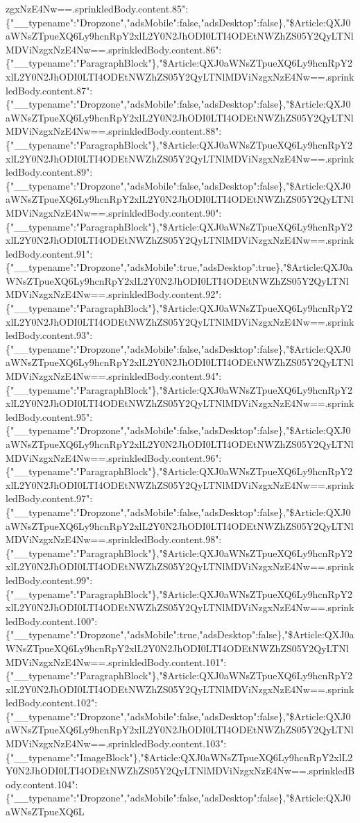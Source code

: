 zgxNzE4Nw==.sprinkledBody.content.85":\{"\_\_typename":"Dropzone","adsMobile":false,"adsDesktop":false\},"\$Article:QXJ0aWNsZTpueXQ6Ly9hcnRpY2xlL2Y0N2JhODI0LTI4ODEtNWZhZS05Y2QyLTNlMDViNzgxNzE4Nw==.sprinkledBody.content.86":\{"\_\_typename":"ParagraphBlock"\},"\$Article:QXJ0aWNsZTpueXQ6Ly9hcnRpY2xlL2Y0N2JhODI0LTI4ODEtNWZhZS05Y2QyLTNlMDViNzgxNzE4Nw==.sprinkledBody.content.87":\{"\_\_typename":"Dropzone","adsMobile":false,"adsDesktop":false\},"\$Article:QXJ0aWNsZTpueXQ6Ly9hcnRpY2xlL2Y0N2JhODI0LTI4ODEtNWZhZS05Y2QyLTNlMDViNzgxNzE4Nw==.sprinkledBody.content.88":\{"\_\_typename":"ParagraphBlock"\},"\$Article:QXJ0aWNsZTpueXQ6Ly9hcnRpY2xlL2Y0N2JhODI0LTI4ODEtNWZhZS05Y2QyLTNlMDViNzgxNzE4Nw==.sprinkledBody.content.89":\{"\_\_typename":"Dropzone","adsMobile":false,"adsDesktop":false\},"\$Article:QXJ0aWNsZTpueXQ6Ly9hcnRpY2xlL2Y0N2JhODI0LTI4ODEtNWZhZS05Y2QyLTNlMDViNzgxNzE4Nw==.sprinkledBody.content.90":\{"\_\_typename":"ParagraphBlock"\},"\$Article:QXJ0aWNsZTpueXQ6Ly9hcnRpY2xlL2Y0N2JhODI0LTI4ODEtNWZhZS05Y2QyLTNlMDViNzgxNzE4Nw==.sprinkledBody.content.91":\{"\_\_typename":"Dropzone","adsMobile":true,"adsDesktop":true\},"\$Article:QXJ0aWNsZTpueXQ6Ly9hcnRpY2xlL2Y0N2JhODI0LTI4ODEtNWZhZS05Y2QyLTNlMDViNzgxNzE4Nw==.sprinkledBody.content.92":\{"\_\_typename":"ParagraphBlock"\},"\$Article:QXJ0aWNsZTpueXQ6Ly9hcnRpY2xlL2Y0N2JhODI0LTI4ODEtNWZhZS05Y2QyLTNlMDViNzgxNzE4Nw==.sprinkledBody.content.93":\{"\_\_typename":"Dropzone","adsMobile":false,"adsDesktop":false\},"\$Article:QXJ0aWNsZTpueXQ6Ly9hcnRpY2xlL2Y0N2JhODI0LTI4ODEtNWZhZS05Y2QyLTNlMDViNzgxNzE4Nw==.sprinkledBody.content.94":\{"\_\_typename":"ParagraphBlock"\},"\$Article:QXJ0aWNsZTpueXQ6Ly9hcnRpY2xlL2Y0N2JhODI0LTI4ODEtNWZhZS05Y2QyLTNlMDViNzgxNzE4Nw==.sprinkledBody.content.95":\{"\_\_typename":"Dropzone","adsMobile":false,"adsDesktop":false\},"\$Article:QXJ0aWNsZTpueXQ6Ly9hcnRpY2xlL2Y0N2JhODI0LTI4ODEtNWZhZS05Y2QyLTNlMDViNzgxNzE4Nw==.sprinkledBody.content.96":\{"\_\_typename":"ParagraphBlock"\},"\$Article:QXJ0aWNsZTpueXQ6Ly9hcnRpY2xlL2Y0N2JhODI0LTI4ODEtNWZhZS05Y2QyLTNlMDViNzgxNzE4Nw==.sprinkledBody.content.97":\{"\_\_typename":"Dropzone","adsMobile":false,"adsDesktop":false\},"\$Article:QXJ0aWNsZTpueXQ6Ly9hcnRpY2xlL2Y0N2JhODI0LTI4ODEtNWZhZS05Y2QyLTNlMDViNzgxNzE4Nw==.sprinkledBody.content.98":\{"\_\_typename":"ParagraphBlock"\},"\$Article:QXJ0aWNsZTpueXQ6Ly9hcnRpY2xlL2Y0N2JhODI0LTI4ODEtNWZhZS05Y2QyLTNlMDViNzgxNzE4Nw==.sprinkledBody.content.99":\{"\_\_typename":"ParagraphBlock"\},"\$Article:QXJ0aWNsZTpueXQ6Ly9hcnRpY2xlL2Y0N2JhODI0LTI4ODEtNWZhZS05Y2QyLTNlMDViNzgxNzE4Nw==.sprinkledBody.content.100":\{"\_\_typename":"Dropzone","adsMobile":true,"adsDesktop":false\},"\$Article:QXJ0aWNsZTpueXQ6Ly9hcnRpY2xlL2Y0N2JhODI0LTI4ODEtNWZhZS05Y2QyLTNlMDViNzgxNzE4Nw==.sprinkledBody.content.101":\{"\_\_typename":"ParagraphBlock"\},"\$Article:QXJ0aWNsZTpueXQ6Ly9hcnRpY2xlL2Y0N2JhODI0LTI4ODEtNWZhZS05Y2QyLTNlMDViNzgxNzE4Nw==.sprinkledBody.content.102":\{"\_\_typename":"Dropzone","adsMobile":false,"adsDesktop":false\},"\$Article:QXJ0aWNsZTpueXQ6Ly9hcnRpY2xlL2Y0N2JhODI0LTI4ODEtNWZhZS05Y2QyLTNlMDViNzgxNzE4Nw==.sprinkledBody.content.103":\{"\_\_typename":"ImageBlock"\},"\$Article:QXJ0aWNsZTpueXQ6Ly9hcnRpY2xlL2Y0N2JhODI0LTI4ODEtNWZhZS05Y2QyLTNlMDViNzgxNzE4Nw==.sprinkledBody.content.104":\{"\_\_typename":"Dropzone","adsMobile":false,"adsDesktop":false\},"\$Article:QXJ0aWNsZTpueXQ6L